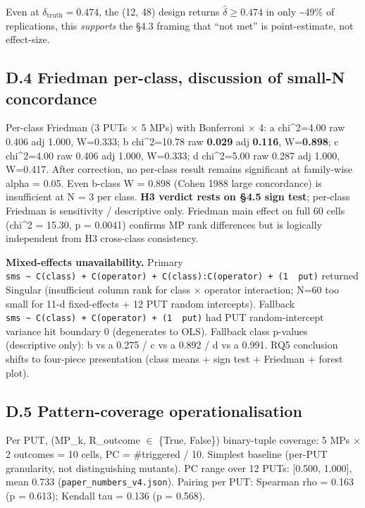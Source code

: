 \documentclass[manuscript,screen,review]{acmart}
\begin{document}
Even at $\delta_{\mathrm{truth}} = 0.474$, the (12, 48) design returns $\hat{\delta} \geq
0.474$ in only \textasciitilde49\% of replications, this
\emph{supports} the §4.3 framing that ``not met'' is point-estimate, not
effect-size.

\subsection{D.4 Friedman per-class, discussion of small-N concordance}\label{d.4-friedman-per-class-discussion-of-small-n-concordance}

Per-class Friedman (3 PUTs $\times$ 5 MPs) with Bonferroni $\times$ 4: a chi\^{}2=4.00
raw 0.406 adj 1.000, W=0.333; b chi\^{}2=10.78 raw \textbf{0.029} adj
\textbf{0.116}, W=\textbf{0.898}; c chi\^{}2=4.00 raw 0.406 adj 1.000,
W=0.333; d chi\^{}2=5.00 raw 0.287 adj 1.000, W=0.417. After correction,
no per-class result remains significant at family-wise alpha = 0.05.
Even b-class W = 0.898 (Cohen 1988 large concordance) is insufficient at
N = 3 per class. \textbf{H3 verdict rests on §4.5 sign test}; per-class
Friedman is sensitivity / descriptive only. Friedman main effect on full
60 cells (chi\^{}2 = 15.30, p = 0.0041) confirms MP rank differences but
is logically independent from H3 cross-class consistency.

\textbf{Mixed-effects unavailability.} Primary
\texttt{sms\ \textasciitilde{}\ C(class)\ +\ C(operator)\ +\ C(class):C(operator)\ +\ (1\ \textbar{}\ put)}
returned Singular (insufficient column rank for class $\times$ operator
interaction; N=60 too small for 11-d fixed-effects + 12 PUT random
intercepts). Fallback
\texttt{sms\ \textasciitilde{}\ C(class)\ +\ C(operator)\ +\ (1\ \textbar{}\ put)}
had PUT random-intercept variance hit boundary 0 (degenerates to OLS).
Fallback class p-values (descriptive only): b vs a 0.275 / c vs a 0.892
/ d vs a 0.991. RQ5 conclusion shifts to four-piece presentation (class
means + sign test + Friedman + forest plot).

\subsection{D.5 Pattern-coverage operationalisation}\label{d.5-pattern-coverage-operationalisation}

Per PUT, (MP\_k, R\_outcome $\in$ \{True, False\}) binary-tuple coverage: 5
MPs $\times$ 2 outcomes = 10 cells, PC = \#triggered / 10. Simplest baseline
(per-PUT granularity, not distinguishing mutants). PC range over 12
PUTs: {[}0.500, 1.000{]}, mean 0.733 (\texttt{paper\_numbers\_v4.json}).
Pairing per PUT: Spearman rho = 0.163 (p = 0.613); Kendall tau = 0.136
(p = 0.568).
\end{document}
